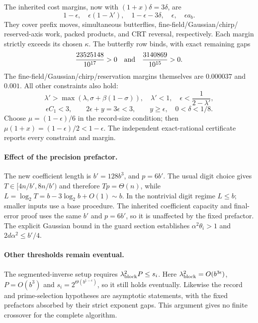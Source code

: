 \documentclass[11pt]{article}
\begin{document}
The inherited cost margins, now with $(1+x)\delta=3\delta$, are
\[
 1-\epsilon,\quad \epsilon(1-\lambda'),\quad
 1-\epsilon-3\delta,\quad\epsilon,\quad\epsilon a_b.
\]
They cover prefix moves, simultaneous butterflies, fine-field/Gaussian/chirp/
reserved-axis work, packed products, and CRT reversal, respectively.
Each margin strictly exceeds its chosen $\kappa$. The butterfly row binds,
with exact remaining gaps
\[
 \frac{23525148}{10^{17}}>0
 \quad\hbox{and}\quad
 \frac{3140869}{10^{15}}>0.
\]
The fine-field/Gaussian/chirp/reservation margins themselves are $0.000037$
and $0.001$. All other constraints also hold:
\[
 \lambda'>\max(\lambda,\sigma+\beta(1-\sigma)),\quad\lambda'<1,
 \quad\epsilon<\frac1{2-\lambda'},
\]
\[
 \epsilon C_1<3,\qquad 2\epsilon+y=3\epsilon<3,
 \qquad y\ge\epsilon,\quad0<\delta<1/8.
\]
Choose $\mu=(1-\epsilon)/6$ in the record-size condition; then
$\mu(1+x)=(1-\epsilon)/2<1-\epsilon$.
The independent exact-rational certificate reports every constraint and margin.

\paragraph{Effect of the precision prefactor.}
The new coefficient length is $b'=128b^3$, and $p=6b'$.
The usual digit choice gives $T\in[4n/b',8n/b')$ and therefore
$Tp=\Theta(n)$, while
$L=\log_2T=b-3\log_2b+O(1)\sim b$.
In the nontrivial digit regime $L\le b$; smaller inputs use a base procedure.
The inherited coefficient capacity and final-error proof uses the same
$b'$ and $p=6b'$, so it is unaffected by the fixed prefactor.
The explicit Gaussian bound in the guard section establishes
$\alpha^2\theta_i>1$ and $2d\alpha^2\le b'/4$.

\paragraph{Other thresholds remain eventual.}
The segmented-inverse setup requires $\lambda_{\rm block}^2P\le s_i$.
Here $\lambda_{\rm block}^2=O(b^{3\epsilon})$, $P=O(b^3)$ and
$s_i=2^{\Theta(b^{1-\epsilon})}$, so it still holds eventually.
Likewise the record and prime-selection hypotheses are asymptotic statements,
with the fixed prefactors absorbed by their strict exponent gaps.
This argument gives no finite crossover for the complete algorithm.
\end{document}

